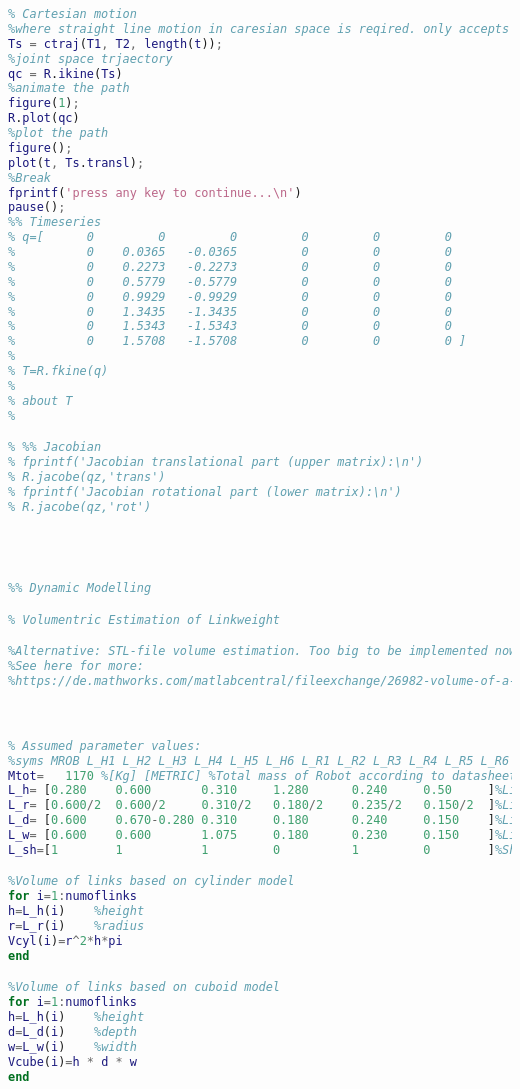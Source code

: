 \begin{lstlisting}[language=Matlab]
%pause();
% Cartesian motion
%where straight line motion in caresian space is reqired. only accepts number of time steps
Ts = ctraj(T1, T2, length(t)); 
%joint space trjaectory
qc = R.ikine(Ts)
%animate the path
figure(1);
R.plot(qc)
%plot the path
figure();
plot(t, Ts.transl);
%Break 
fprintf('press any key to continue...\n')
pause();
%% Timeseries
% q=[      0         0         0         0         0         0
%          0    0.0365   -0.0365         0         0         0
%          0    0.2273   -0.2273         0         0         0
%          0    0.5779   -0.5779         0         0         0
%          0    0.9929   -0.9929         0         0         0
%          0    1.3435   -1.3435         0         0         0
%          0    1.5343   -1.5343         0         0         0
%          0    1.5708   -1.5708         0         0         0 ]
% 
% T=R.fkine(q)
% 
% about T
% 

% %% Jacobian
% fprintf('Jacobian translational part (upper matrix):\n')
% R.jacobe(qz,'trans')
% fprintf('Jacobian rotational part (lower matrix):\n')
% R.jacobe(qz,'rot')




%% Dynamic Modelling

% Volumentric Estimation of Linkweight

%Alternative: STL-file volume estimation. Too big to be implemented now.
%See here for more:
%https://de.mathworks.com/matlabcentral/fileexchange/26982-volume-of-a-surface-triangulation



% Assumed parameter values:
%syms MROB L_H1 L_H2 L_H3 L_H4 L_H5 L_H6 L_R1 L_R2 L_R3 L_R4 L_R5 L_R6 L_D1 L_D2 L_D3 L_D4 L_D5 L_D6 L_W1 L_W2 L_W3 L_W4 L_W5 L_W6 %integer positive
Mtot=   1170 %[Kg] [METRIC] %Total mass of Robot according to datasheet
L_h= [0.280    0.600       0.310     1.280      0.240     0.50     ]%LinkHeight (z)
L_r= [0.600/2  0.600/2     0.310/2   0.180/2    0.235/2   0.150/2  ]%LinkRadius
L_d= [0.600    0.670-0.280 0.310     0.180      0.240     0.150    ]%LinkDepth (y)
L_w= [0.600    0.600       1.075     0.180      0.230     0.150    ]%LinkWidth (x)
L_sh=[1        1           1         0          1         0        ]%Shape (0=cyl 1=cube 1<zeroMass 0>error)

%Volume of links based on cylinder model
for i=1:numoflinks
h=L_h(i)    %height
r=L_r(i)    %radius    
Vcyl(i)=r^2*h*pi
end

%Volume of links based on cuboid model
for i=1:numoflinks
h=L_h(i)    %height
d=L_d(i)    %depth
w=L_w(i)    %width    
Vcube(i)=h * d * w
end


\end{lstlisting}
